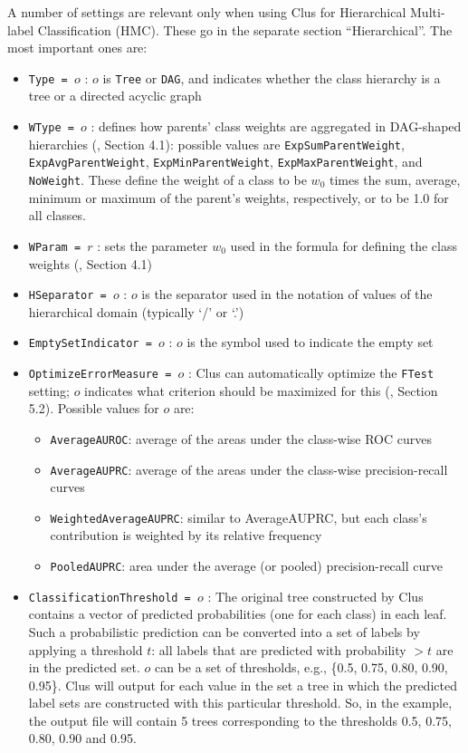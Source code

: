 A number of settings are relevant only when using Clus for Hierarchical Multi-label Classification (HMC).  These go in the separate section ``Hierarchical''.  The most important ones are:

\begin{itemize}
\item {\tt Type = $o$} : $o$ is {\tt Tree} or {\tt DAG}, and indicates whether the class hierarchy is a tree or a directed acyclic graph \cite{hmc-paper}
\item {\tt WType = $o$} : defines how parents' class weights are aggregated in DAG-shaped hierarchies (\cite{Vens08:jrnl}, Section 4.1): possible values are {\tt ExpSumParentWeight}, {\tt ExpAvgParentWeight}, {\tt ExpMinParentWeight}, {\tt ExpMaxParentWeight}, and {\tt NoWeight}.  These define the weight of a class to be $w_0$ times the sum, average, minimum or maximum of the parent's weights, respectively, or to be 1.0 for all classes. 
\item {\tt WParam = $r$} : sets the parameter $w_0$ used in the formula for defining the class weights (\cite{Vens08:jrnl}, Section 4.1)
\item {\tt HSeparator = $o$} : $o$ is the separator used in the notation of values of the hierarchical domain (typically `/' or `.') 
\item {\tt EmptySetIndicator = $o$} : $o$ is the symbol used to indicate the empty set
\item {\tt OptimizeErrorMeasure = $o$} : Clus can automatically optimize the {\tt FTest} setting; $o$ indicates what criterion should be maximized for this (\cite{Vens08:jrnl}, Section 5.2).  Possible values for $o$ are:
  \begin{itemize}
   \item {\tt AverageAUROC}: average of the areas under the class-wise ROC curves
   \item {\tt AverageAUPRC}: average of the areas under the class-wise precision-recall curves
   \item {\tt WeightedAverageAUPRC}: similar to AverageAUPRC, but each class's contribution is                         weighted by its relative frequency
   \item {\tt PooledAUPRC}: area under the average (or pooled) precision-recall curve
  \end{itemize}
\item {\tt ClassificationThreshold = $o$} : The original tree constructed by Clus contains a vector of predicted probabilities (one for each class) in each leaf. Such a probabilistic prediction can be converted into a set of labels by applying a threshold $t$: all labels that are predicted with probability $> t$ are in the predicted set.  $o$ can be a set of thresholds, e.g., \{0.5, 0.75, 0.80, 0.90, 0.95\}. Clus will output for each value in the set a tree in which the predicted label sets are constructed with this particular threshold. So, in the example, the output file will contain 5 trees corresponding to the thresholds 0.5, 0.75, 0.80, 0.90 and 0.95.

\end{itemize}
